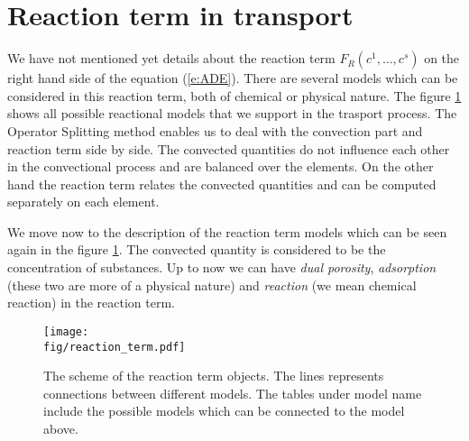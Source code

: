 \def\abs#1{\lvert#1\rvert}
\def\argdot{{\hspace{0.18em}\cdot\hspace{0.18em}}}
\def\avg#1{\left\{#1\right\}_\omega}
\def\D{{\tn D}}
\def\div{\operatorname{div}}
\def\Eh{\mathcal E_h}       %
\def\Ehcom{\mathcal E_{h,C}}         %
\def\Ehdir{\mathcal E_{h,D}}         %
\def\Ehint{\mathcal E_{h,I}}       %
\def\grad{\nabla}
\def\jmp#1{[#1]}
\def\n{\vc n}
\def\vc#1{\mathbf{\boldsymbol{#1}}}     %
\def\R{\mathbb R}
\def\sc#1#2{\left(#1,#2\right)}
\def\Th{\mathcal T_h}       %
\def\th{\vartheta}
\def\tn#1{{\mathbb{#1}}}    %
\def\Tr{\operatorname{Tr}}
\def\where{\,|\,}

\section{Reaction term in transport}
\label{sec:reaction_term}

We have not mentioned yet details about the reaction term $F_R(c^1,\ldots,c^s)$ on the right hand side of the equation (\ref{e:ADE}).
There are several models which can be considered in this reaction term, both of chemical or physical nature. 
The figure \ref{fig:reaction_term} shows all possible reactional models that we support in the trasport process. The Operator Splitting method enables 
us to deal with the convection part and reaction term side by side. The convected quantities do not influence each other in the convectional
process and are balanced over the elements. On the other hand the reaction term relates the convected quantities and can be computed 
separately on each element.

We move now to the description of the reaction term models which can be seen again in the figure \ref{fig:reaction_term}. 
The convected quantity is considered to be the concentration of substances. 
Up to now we can have \emph{dual porosity}, \emph{adsorption} (these two are more of a physical nature) and \emph{reaction} (we mean chemical 
reaction) in the reaction term. 

\begin{figure}
  \centering
  \texttt{[image: \\fig/reaction\_term.pdf]}
  \caption{The scheme of the reaction term objects. The lines represents connections between different models. 
  The tables under model name include the possible models which can be connected to the model above.}
  \label{fig:reaction_term}
\end{figure}

